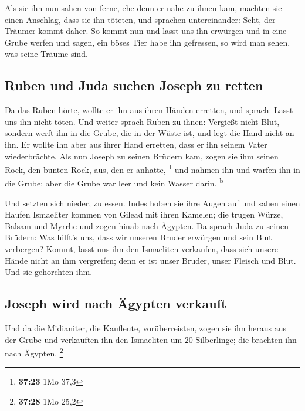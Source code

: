  Als sie ihn nun sahen von ferne, ehe denn er nahe zu
ihnen kam, machten sie einen Anschlag, dass sie ihn töteten,
 und sprachen untereinander: Seht, der Träumer kommt
daher.  So kommt nun und lasst uns ihn erwürgen und in
eine Grube werfen und sagen, ein böses Tier habe ihn gefressen, so wird
man sehen, was seine Träume sind.

\hypertarget{ruben-und-juda-suchen-joseph-zu-retten}{%
\subsection{Ruben und Juda suchen Joseph zu
retten}\label{ruben-und-juda-suchen-joseph-zu-retten}}

 Da das Ruben hörte, wollte er ihn aus ihren Händen
erretten, und sprach: Lasst uns ihn nicht töten.  Und
weiter sprach Ruben zu ihnen: Vergießt nicht Blut, sondern werft ihn in
die Grube, die in der Wüste ist, und legt die Hand nicht an ihn. Er
wollte ihn aber aus ihrer Hand erretten, dass er ihn seinem Vater
wiederbrächte.  Als nun Joseph zu seinen Brüdern kam,
zogen sie ihm seinen Rock, den bunten Rock, aus, den er anhatte,
\footnote{\textbf{37:23} 1Mo 37,3}  und nahmen ihn und
warfen ihn in die Grube; aber die Grube war leer und kein Wasser darin.
\textsuperscript{b}

 Und setzten sich nieder, zu essen. Indes hoben sie ihre
Augen auf und sahen einen Haufen Ismaeliter kommen von Gilead mit ihren
Kamelen; die trugen Würze, Balsam und Myrrhe und zogen hinab nach
Ägypten.  Da sprach Juda zu seinen Brüdern: Was hilft's
uns, dass wir unseren Bruder erwürgen und sein Blut verbergen?
 Kommt, lasst uns ihn den Ismaeliten verkaufen, dass sich
unsere Hände nicht an ihm vergreifen; denn er ist unser Bruder, unser
Fleisch und Blut. Und sie gehorchten ihm.

\hypertarget{joseph-wird-nach-uxe4gypten-verkauft}{%
\subsection{Joseph wird nach Ägypten
verkauft}\label{joseph-wird-nach-uxe4gypten-verkauft}}

 Und da die Midianiter, die Kaufleute, vorüberreisten,
zogen sie ihn heraus aus der Grube und verkauften ihn den Ismaeliten um
20 Silberlinge; die brachten ihn nach Ägypten. \footnote{\textbf{37:28}
  1Mo 25,2}

